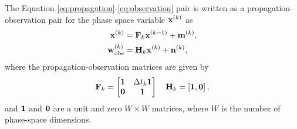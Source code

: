 \documentclass[fleqn,usenatbib]{mnras}
\begin{document}
    The Equation \eqref{eq:propagation}-\eqref{eq:observation} pair is written
    as a propagation-observation pair for the phase space variable
    $\mathbf{x}^{(k)}$ as
    \begin{align}
        \mathbf{x}^{(k)} &= \mathbf{F}_{k} \mathbf{x}^{(k-1)} + \mathbf{m}^{(k)}, \label{eq:kalman_forward1}
        \\
        \mathbf{w}^{(k)}_{\rm obs} &= \mathbf{H}_k \mathbf{x}^{(k)} + \mathbf{n}^{(k)}, \label{eq:kalman_forward2}
    \end{align} 
    where the propagation-observation matrices are given by
    \begin{equation}
        \mathbf{F}_k =
            \begin{bmatrix}
                \bf{1} & \Delta t_k \bf{1}  \\
                {\bf 0} & \bf{1}
            \end{bmatrix}
            \quad \mathbf{H}_k = \left[\bf{1},{\bf 0}\right],
    \end{equation}
    and  $\bf{1}$ and ${\bf 0}$ are a unit and zero $W\times W$ matrices, where
    $W$ is the number of phase-space dimensions.
\end{document}
